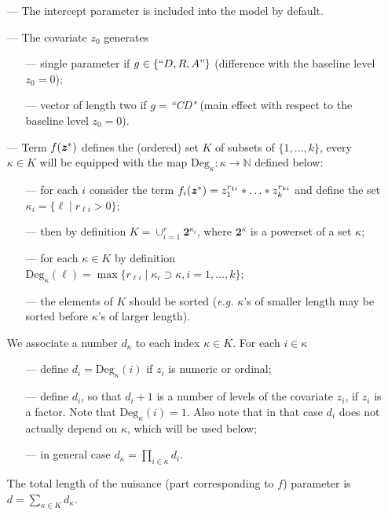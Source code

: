 \documentclass[11pt]{article}
\begin{document}
\begin{itemize}
\setlength\itemsep{-0.3em}
\item[---]
The intercept parameter is included into the model by default.
\item[---]
The covariate $z_0$ generates\vspace{-2mm}
\begin{itemize}
\setlength\itemsep{-0.3em}
\item[---]
single parameter if $g\in\{``D,R,A"\}$ (difference with the baseline level $z_0=0$);
\item[---]
vector of length two if $g=${\it ``CD"} (main effect with respect to the baseline level $z_0=0$).
\end{itemize}
\item[---]
Term $f(\mbox{\textbf{\textit z}}^*)$ defines the (ordered) set $K$ of subsets of $\{1,\ldots,k\}$, every $\kappa\in K$ will be equipped with the map $\mathrm{Deg}_\kappa\colon \kappa\to \mathbb{N}$ defined below:
\vspace{-2mm}
\begin{itemize}
\setlength\itemsep{-0.3em}
\item[---]
for each $i$ consider the term $f_i(\mbox{\textbf{\textit z}}^*)=z_1^{r_{1i}}*\ldots*z_k^{r_{ki}}$ and define the set $\kappa_i = \{\ell \mid r_{\ell i} > 0\}$;
\item[---]
then by definition $K=\cup_{i=1}^r \mathbf{2}^{\kappa_i}$, where $\mathbf{2}^{\kappa}$ is a powerset of a set $\kappa$;
\item[---]
for each $\kappa\in K$ by definition $\mathrm{Deg}_\kappa(\ell) = \max \{r_{\ell i} \mid \kappa_i \supset \kappa, i = 1,\ldots,k \}$;
\item[---]
the elements of $K$ should be sorted (\textit{e.g.} $\kappa$'s of smaller length may be sorted before $\kappa$'s of larger length).
\end{itemize}
We associate a number $d_{\kappa}$ to each index $\kappa\in K$. For each $i\in\kappa$\vspace{-2mm}
\begin{itemize}
\setlength\itemsep{-0.3em}
\item[---]
define $d_i=\mathrm{Deg}_\kappa(i)$ if $z_i$ is numeric or ordinal;
\item[---]
define $d_i$, so that $d_i+1$ is a number of levels of the covariate $z_i$, if $z_i$ is a factor. Note that $\mathrm{Deg}_\kappa(i) = 1$. Also note that in that case $d_i$ does not actually depend on $\kappa$, which will be used below;
\item[---]
in general case $d_{\kappa}=\prod_{i\in\kappa} d_i$. 
\end{itemize}
The total length of the nuisance (part corresponding to $f$) parameter is $d=\sum_{\kappa\in K} d_{\kappa}$. 
\end{itemize}
\end{document}
